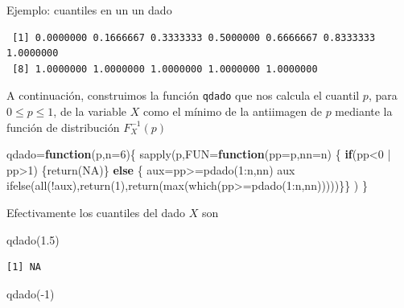 \documentclass[
  letterpaper,
  DIV=11,
  numbers=noendperiod]{scrreprt}
\newenvironment{Shaded}{\begin{snugshade}}{\end{snugshade}}
\newcommand{\AttributeTok}[1]{\textcolor[rgb]{0.40,0.45,0.13}{#1}}
\newcommand{\ConstantTok}[1]{\textcolor[rgb]{0.56,0.35,0.01}{#1}}
\newcommand{\ControlFlowTok}[1]{\textcolor[rgb]{0.00,0.23,0.31}{\textbf{#1}}}
\newcommand{\DecValTok}[1]{\textcolor[rgb]{0.68,0.00,0.00}{#1}}
\newcommand{\FloatTok}[1]{\textcolor[rgb]{0.68,0.00,0.00}{#1}}
\newcommand{\FunctionTok}[1]{\textcolor[rgb]{0.28,0.35,0.67}{#1}}
\newcommand{\NormalTok}[1]{\textcolor[rgb]{0.00,0.23,0.31}{#1}}
\newcommand{\OtherTok}[1]{\textcolor[rgb]{0.00,0.23,0.31}{#1}}
\newcommand{\SpecialCharTok}[1]{\textcolor[rgb]{0.37,0.37,0.37}{#1}}
\begin{document}
\begin{Ejemplo}{Ejemplo: cuantiles en un un dado}{}
\begin{verbatim}
 [1] 0.0000000 0.1666667 0.3333333 0.5000000 0.6666667 0.8333333 1.0000000
 [8] 1.0000000 1.0000000 1.0000000 1.0000000 1.0000000
\end{verbatim}

A continuación, construimos la función \texttt{qdado} que nos calcula el
cuantil \(p\), para \(0\leq p\leq 1\), de la variable \(X\) como el
mínimo de la antiimagen de \(p\) mediante la función de distribución
\(F_X^{-1}(p)\)

\begin{Shaded}
\begin{Highlighting}[]
\NormalTok{qdado}\OtherTok{=}\ControlFlowTok{function}\NormalTok{(p,}\AttributeTok{n=}\DecValTok{6}\NormalTok{)\{}
\FunctionTok{sapply}\NormalTok{(p,}\AttributeTok{FUN=}\ControlFlowTok{function}\NormalTok{(}\AttributeTok{pp=}\NormalTok{p,}\AttributeTok{nn=}\NormalTok{n) }
\NormalTok{  \{}
  \ControlFlowTok{if}\NormalTok{(pp}\SpecialCharTok{\textless{}}\DecValTok{0} \SpecialCharTok{|}\NormalTok{ pp}\SpecialCharTok{\textgreater{}}\DecValTok{1}\NormalTok{) \{}\FunctionTok{return}\NormalTok{(}\ConstantTok{NA}\NormalTok{)\}}
  \ControlFlowTok{else}\NormalTok{ \{}
\NormalTok{  aux}\OtherTok{=}\NormalTok{pp}\SpecialCharTok{\textgreater{}=}\FunctionTok{pdado}\NormalTok{(}\DecValTok{1}\SpecialCharTok{:}\NormalTok{n,nn)}
\NormalTok{  aux}
  \FunctionTok{ifelse}\NormalTok{(}\FunctionTok{all}\NormalTok{(}\SpecialCharTok{!}\NormalTok{aux),}\FunctionTok{return}\NormalTok{(}\DecValTok{1}\NormalTok{),}\FunctionTok{return}\NormalTok{(}\FunctionTok{max}\NormalTok{(}\FunctionTok{which}\NormalTok{(pp}\SpecialCharTok{\textgreater{}=}\FunctionTok{pdado}\NormalTok{(}\DecValTok{1}\SpecialCharTok{:}\NormalTok{n,nn)))))\}\}}
\NormalTok{)}
\NormalTok{\}}
\end{Highlighting}
\end{Shaded}

Efectivamente los cuantiles del dado \(X\) son

\begin{Shaded}
\begin{Highlighting}[]
\FunctionTok{qdado}\NormalTok{(}\FloatTok{1.5}\NormalTok{)}
\end{Highlighting}
\end{Shaded}

\begin{verbatim}
[1] NA
\end{verbatim}

\begin{Shaded}
\begin{Highlighting}[]
\FunctionTok{qdado}\NormalTok{(}\SpecialCharTok{{-}}\DecValTok{1}\NormalTok{)}
\end{Highlighting}
\end{Shaded}


\end{Ejemplo}
\end{document}
